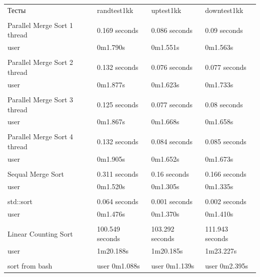 \begin{tabular}{ l l l l }
Тесты & randtest1kk & uptest1kk & downtest1kk \\
\\
Parallel Merge Sort 1 thread & 0.169 seconds & 0.086 seconds & 0.09 seconds \\
user & 0m1.790s & 0m1.551s & 0m1.563s & \\
\\
Parallel Merge Sort 2 thread & 0.132 seconds & 0.076 seconds & 0.077 seconds \\
user & 0m1.877s & 0m1.623s & 0m1.733s & \\
\\
Parallel Merge Sort 3 thread & 0.125 seconds & 0.077 seconds & 0.08 seconds \\
user & 0m1.867s & 0m1.668s & 0m1.658s &\\
\\
Parallel Merge Sort 4 thread & 0.132 seconds & 0.084 seconds & 0.085 seconds \\
user & 0m1.905s & 0m1.652s & 0m1.673s \\
\\
Sequal Merge Sort & 0.311 seconds & 0.16 seconds & 0.166 seconds \\
user & 0m1.520s & 0m1.305s & 0m1.335s \\
\\
std::sort & 0.064 seconds & 0.001 seconds & 0.002 seconds \\
user & 0m1.476s & 0m1.370s & 0m1.410s \\
\\
Linear Counting Sort & 100.549 seconds & 103.292 seconds & 111.943 seconds \\
user & 1m20.188s & 1m20.185s & 1m23.227s \\
\\
sort from bash & user 0m1.088s & user 0m1.139s & user 0m2.395s \\
\end{tabular}

